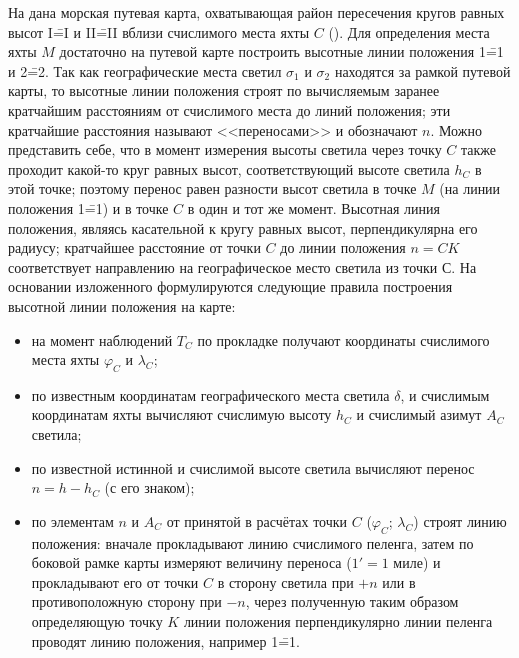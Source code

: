 На  дана морская путевая карта, охватывающая район
пересечения кругов равных высот I\==I и II\==II вблизи счислимого
места яхты $C$ (). Для определения места яхты $M$ достаточно
на путевой карте построить высотные линии положения 1\==1 и 2\==2. Так
как географические места светил $\sigma_1$ и $\sigma_2$ находятся за
рамкой путевой карты, то высотные линии положения строят по
вычисляемым заранее кратчайшим расстояниям от счислимого места до
линий положения; эти кратчайшие расстояния называют <<переносами>> и
обозначают $n$. Можно представить себе, что в момент измерения высоты
светила через точку $C$ также проходит какой-то круг равных высот,
соответствующий высоте светила $h_C$ в этой точке; поэтому перенос
равен разности высот светила в точке $M$ (на линии положения 1\==1) и
в точке $C$ в один и тот же момент. Высотная линия положения, являясь
касательной к кругу равных высот, перпендикулярна его радиусу;
кратчайшее расстояние от точки $C$ до линии положения $n = CK$
соответствует направлению на географическое место светила из точки
С. На основании изложенного формулируются следующие правила построения
высотной линии положения на карте:
\begin{itemize}
\item на момент наблюдений $T_C$ по прокладке получают координаты
  счислимого места яхты $\varphi_C$ и $\lambda_C$;
\item по известным координатам географического места светила $\delta$, \tGR и
  счислимым координатам яхты вычисляют счислимую высоту $h_C$ и счислимый
  азимут $A_C$ светила;
\item по известной истинной и счислимой высоте светила вычисляют
  перенос $n = h - h_C$ (с его знаком);
\item по элементам $n$ и $A_C$ от принятой в расчётах точки $C$
  ($\varphi_C$; $\lambda_C$) строят линию положения: вначале
  прокладывают линию счислимого пеленга, затем по боковой рамке карты
  измеряют величину переноса ($1' = 1$ миле) и прокладывают его от
  точки $C$ в сторону светила при $+n$ или в противоположную сторону
  при $-n$, через полученную таким образом определяющую точку $K$
  линии положения перпендикулярно линии пеленга проводят линию
  положения, например 1\==1.
\end{itemize}

